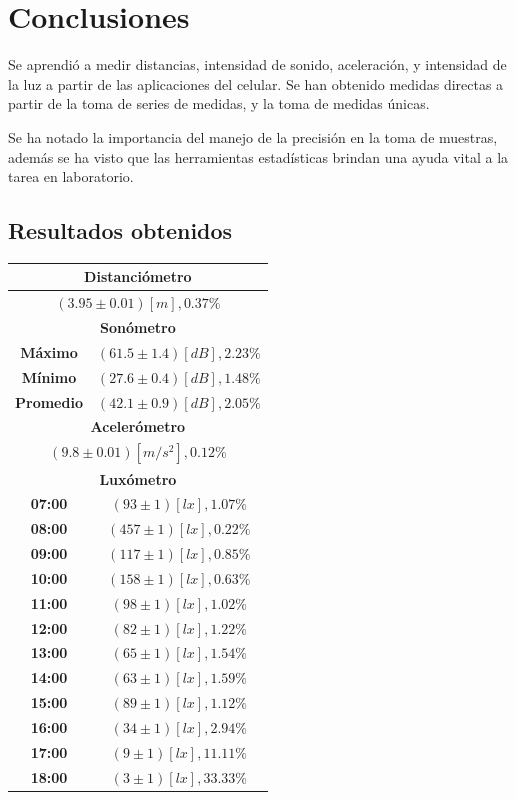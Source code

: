 \documentclass[letter,11pt]{article}
\begin{document}
\section{Conclusiones}
Se aprendió a medir distancias, intensidad de sonido, aceleración, y intensidad
de la luz a partir de las aplicaciones del celular. Se han obtenido medidas
directas a partir de la toma de series de medidas, y la toma de medidas únicas.

Se ha notado la importancia del manejo de la precisión en la toma de muestras,
además se ha visto que las herramientas estadísticas brindan una ayuda vital a
la tarea en laboratorio.

\subsection{Resultados obtenidos}

\begin{center}
\begin{tabular}{|c|c|}
\hline
\multicolumn{2}{|c|}{\textbf{Distanciómetro}} \\
\hline
\multicolumn{2}{|c|}{$(3.95\pm0.01)[m], 0.37\%$} \\
\hline
\multicolumn{2}{|c|}{\textbf{Sonómetro}} \\
\hline
\textbf{Máximo} & $(61.5\pm1.4)[dB], 2.23\%$ \\
\textbf{Mínimo} & $(27.6\pm0.4)[dB], 1.48\%$ \\
\textbf{Promedio} & $(42.1\pm0.9)[dB], 2.05\%$ \\
\hline
\multicolumn{2}{|c|}{\textbf{Acelerómetro}} \\
\hline
\multicolumn{2}{|c|}{$(9.8\pm0.01)[m/s^2], 0.12\%$} \\
\hline
\multicolumn{2}{|c|}{\textbf{Luxómetro}} \\
\hline
\textbf{07:00} & $( 93\pm1)[lx],  1.07\%$ \\
\textbf{08:00} & $(457\pm1)[lx],  0.22\%$ \\
\textbf{09:00} & $(117\pm1)[lx],  0.85\%$ \\
\textbf{10:00} & $(158\pm1)[lx],  0.63\%$ \\
\textbf{11:00} & $( 98\pm1)[lx],  1.02\%$ \\
\textbf{12:00} & $( 82\pm1)[lx],  1.22\%$ \\
\textbf{13:00} & $( 65\pm1)[lx],  1.54\%$ \\
\textbf{14:00} & $( 63\pm1)[lx],  1.59\%$ \\
\textbf{15:00} & $( 89\pm1)[lx],  1.12\%$ \\
\textbf{16:00} & $( 34\pm1)[lx],  2.94\%$ \\
\textbf{17:00} & $(  9\pm1)[lx], 11.11\%$ \\
\textbf{18:00} & $(  3\pm1)[lx], 33.33\%$ \\
\hline
\end{tabular}
\end{center}
\end{document}
